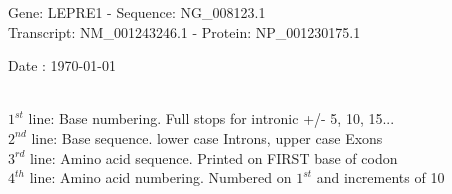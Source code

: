 \documentclass{article}
\begin{document}
\renewcommand{\footrulewidth}{1pt}
\renewcommand{\headrulewidth}{0pt}
\begin{center}
\begin{large}
Gene: LEPRE1 - Sequence: NG\_008123.1\\
Transcript: NM\_001243246.1 - Protein: NP\_001230175.1
 
 Date : \today\\\\
\end{large}
\end{center}
$1^{st}$ line: Base numbering. Full stops for intronic +/- 5, 10, 15...\\
$2^{nd}$ line: Base sequence. lower case Introns, upper case Exons\\
$3^{rd}$ line: Amino acid sequence. Printed on FIRST base of codon\\
$4^{th}$ line: Amino acid numbering. Numbered on $1^{st}$ and increments of 10\\
\end{document}
